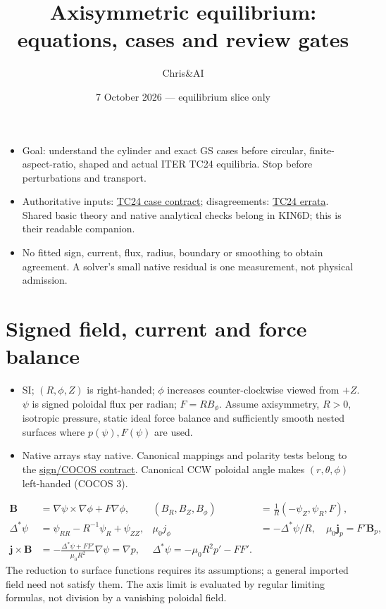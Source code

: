 \documentclass[11pt,a4paper]{article}
\title{Axisymmetric equilibrium: equations, cases and review gates}
\author{Chris\&AI}
\date{7 October 2026 --- equilibrium slice only}
\newcommand{\ds}{\Delta^*}
\newcommand{\pp}{p'}
\newcommand{\tc}{https://gitlab.tugraz.at/plasma/proj/ntv/iter_tc24/-/blob/plan/circular-tokamak-benchmark-20261007/}
\begin{document}
\maketitle
\vspace{-10mm}
\begin{itemize}
\item Goal: understand the cylinder and exact GS cases before circular, finite-aspect-ratio, shaped and actual ITER TC24 equilibria. Stop before perturbations and transport.
\item Authoritative inputs: \href{\tc equilibrium/CASE_CONTRACT.md}{TC24 case contract}; disagreements: \href{\tc equilibrium/ERRATA.md}{TC24 errata}. Shared basic theory and native analytical checks belong in KIN6D; this is their readable companion.
\item No fitted sign, current, flux, radius, boundary or smoothing to obtain agreement. A solver's small native residual is one measurement, not physical admission.
\end{itemize}

\section*{Signed field, current and force balance}
\begin{itemize}
\item SI; $(R,\phi,Z)$ is right-handed; $\phi$ increases counter-clockwise viewed from $+Z$. $\psi$ is signed poloidal flux per radian; $F=RB_\phi$. Assume axisymmetry, $R>0$, isotropic pressure, static ideal force balance and sufficiently smooth nested surfaces where $p(\psi),F(\psi)$ are used.
\item Native arrays stay native. Canonical mappings and polarity tests belong to the \href{https://gitlab.tugraz.at/plasma/proj/plasma-sign-conventions/-/blob/main/docs/AXISYMMETRIC_COCOS_CONTRACT.md}{sign/COCOS contract}. Canonical CCW poloidal angle makes $(r,\theta,\phi)$ left-handed (COCOS 3).
\end{itemize}
\begin{align*}
\mathbf B&=\nabla\psi\times\nabla\phi+F\nabla\phi,
& (B_R,B_Z,B_\phi)&=\frac1R(-\psi_Z,\psi_R,F),\\
\ds\psi&=\psi_{RR}-R^{-1}\psi_R+\psi_{ZZ},
&\mu_0j_\phi&=-\ds\psi/R,\quad \mu_0\mathbf j_p=F'\mathbf B_p,\\
\mathbf j\times\mathbf B&=-\frac{\ds\psi+FF'}{\mu_0R^2}\nabla\psi
=\nabla p,
&\boxed{\ds\psi=-\mu_0R^2\pp-FF'.}
\end{align*}
The reduction to surface functions requires its assumptions; a general imported field need not satisfy them. The axis limit is evaluated by regular limiting formulas, not division by a vanishing poloidal field.
\end{document}
